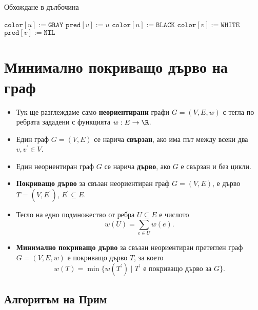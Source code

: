\begin{algorithm}[H]
  \caption{Обхождане в дълбочина}
  \label{alg:dfs-visit}
  \begin{algorithmic}[1]
    \State $\texttt{color}[u] := \texttt{GRAY}$
    \State $\texttt{pred}[v] := u$
    \State {}
    \EndIf
    \EndFor
    \State $\texttt{color}[u] := \texttt{BLACK}$
    \EndProcedure
    \Statex
    \State $\texttt{color}[v] := \texttt{WHITE}$
    \State $\texttt{pred}[v] := \texttt{NIL}$
    \EndFor    
    \State{}
    \EndIf
    \EndFor
    \EndProcedure
  \end{algorithmic}
\end{algorithm}


\section{Минимално покриващо дърво на граф}


\begin{itemize}
\item
  Тук ще разглеждаме само {\bf неориентирани} графи $G = (V,E,w)$ с тегла по ребрата
  зададени с функцията $w:E\to\R$.
\item
  Един граф $G = (V,E)$ се нарича {\bf свързан}, ако има път между всеки два $v,v^\prime \in V$.
\item 
  Един неориентиран граф $G$ се нарича {\bf дърво}, ако $G$ е свързан и без цикли.
\item
  {\bf Покриващо дърво} за свъзан неориентиран граф $G = (V,E)$,
  е дърво $T = (V,E^\prime)$, $E^\prime \subseteq E$.
\item
  Тегло на едно подмножество от ребра $U \subseteq E$ е числото
  \[w(U) = \sum_{e \in U} w(e).\]
\item
  {\bf Минимално покриващо дърво} за свъзан неориентиран претеглен граф $G = (V,E,w)$
  е покриващо дърво $T$, за което 
  \[w(T) = \min\{w(T^\prime) \mid T^\prime\mbox{ е покриващо дърво за }G\}.\]
\end{itemize}

\subsection{Алгоритъм на Прим}

